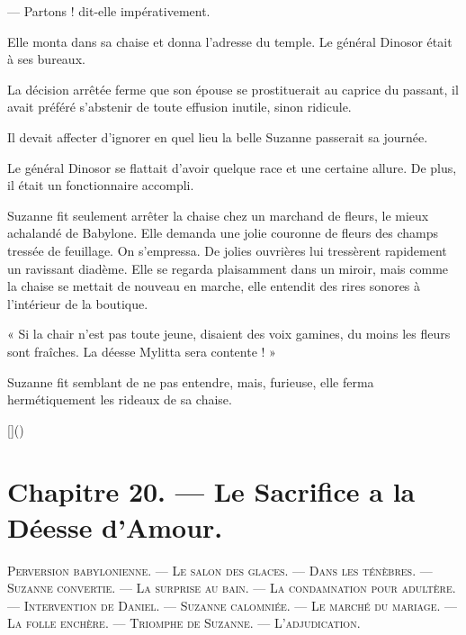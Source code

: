 \documentclass[a4paper, 11pt, oneside, polutonikogreek, french]{article}
\begin{document}
--- Partons ! dit-elle impérativement.

\bigskip
\centerline{\EightStarTaper}
\centerline{\EightStarTaper\EightStarTaper}
\bigskip

Elle monta dans sa chaise et donna l'adresse du temple. Le général Dinosor était à ses bureaux.

La décision arrêtée ferme que son épouse se prostituerait au caprice du passant, il avait préféré s'abstenir de toute effusion inutile, sinon ridicule.

Il devait affecter d'ignorer en quel lieu la belle Suzanne passerait sa journée.

Le général Dinosor se flattait d'avoir quelque race et une certaine allure. De plus, il était un fonctionnaire accompli.

\bigskip
\centerline{\EightStarTaper}
\centerline{\EightStarTaper\EightStarTaper}
\bigskip

Suzanne fit seulement arrêter la chaise chez un marchand de fleurs, le mieux achalandé de Babylone. Elle demanda une jolie couronne de fleurs des champs tressée de feuillage. On s'empressa. De jolies ouvrières lui tressèrent rapidement un ravissant diadème. Elle se regarda plaisamment dans un miroir, mais comme la chaise se mettait de nouveau en marche, elle entendit des rires sonores à l'intérieur de la boutique.

« Si la chair n'est pas toute jeune, disaient des voix gamines, du moins les fleurs sont fraîches. La déesse Mylitta sera contente ! »

Suzanne fit semblant de ne pas entendre, mais, furieuse, elle ferma hermétiquement les rideaux de sa chaise.

[]()
\clearpage
\section{Chapitre 20. --- Le Sacrifice a la Déesse d'Amour.}
\begin{center}
\scshape
\small
Perversion babylonienne. --- Le salon des glaces. --- Dans les ténèbres. --- Suzanne convertie. --- La surprise au bain. --- La condamnation pour adultère. --- Intervention de Daniel. --- Suzanne calomniée. --- Le marché du mariage. --- La folle enchère. --- Triomphe de Suzanne. --- L'adjudication.
\end{center}
\end{document}
